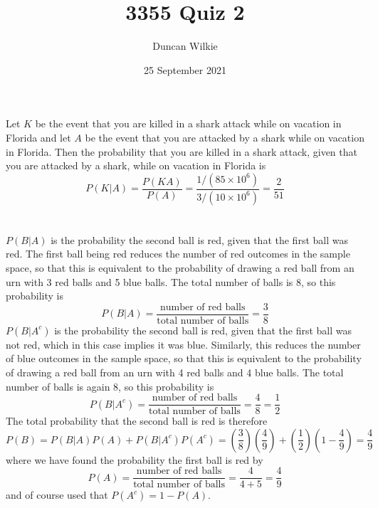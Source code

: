 \documentclass{article}
\title{3355 Quiz 2}
\author{Duncan Wilkie}
\date{25 September 2021}
\begin{document}
\maketitle

\section{}
Let $K$ be the event that you are killed in a shark attack while on vacation in Florida and let $A$ be the event that you are attacked by a shark while on vacation in Florida.
Then the probability that you are killed in a shark attack, given that you are attacked by a shark, while on vacation in Florida is
\[P(K|A) = \frac{P(KA)}{P(A)}=\frac{1/(85\times 10^6)}{3/(10\times 10^6)}=\frac{2}{51}\]
\section{}
$P(B|A)$ is the probability the second ball is red, given that the first ball was red.
The first ball being red reduces the number of red outcomes in the sample space, so that this is equivalent to the probability of drawing a red ball from an urn with 3 red balls and 5 blue balls.
The total number of balls is 8, so this probability is
\[P(B|A)=\frac{\textrm{number of red balls}}{\textrm{total number of balls}}=\frac{3}{8}\]
$P(B|A^c)$ is the probability the second ball is red, given that the first ball was not red, which in this case implies it was blue.
Similarly, this reduces the number of blue outcomes in the sample space, so that this is equivalent to the probability of drawing a red ball from an urn with 4 red balls and 4 blue balls.
The total number of balls is again 8, so this probability is
\[P(B|A^c)=\frac{\textrm{number of red balls}}{\textrm{total number of balls}}=\frac{4}{8}=\frac{1}{2}\]
The total probability that the second ball is red is therefore
\[P(B)=P(B|A)P(A)+P(B|A^c)P(A^c)=\left( \frac{3}{8} \right)\left( \frac{4}{9} \right)+\left( \frac{1}{2} \right)\left(1- \frac{4}{9} \right)=\frac{4}{9}\]
where we have found the probability the first ball is red by \[P(A)=\frac{\textrm{number of red balls}}{\textrm{total number of balls}}=\frac{4}{4+5}=\frac{4}{9}\]
and of course used that $P(A^c)=1-P(A)$.
\end{document}
